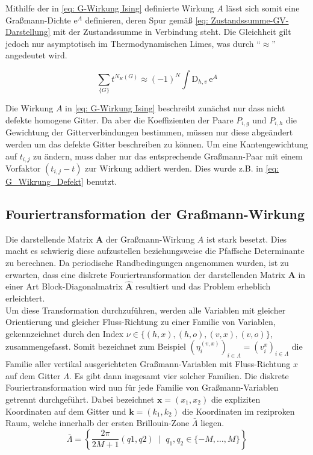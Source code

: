 \noindent Mithilfe der in \eqref{eq: G-Wirkung Ising} definierte Wirkung $A$ lässt sich somit eine Graßmann-Dichte $\mathrm{e}^A$ definieren, deren Spur gemäß \eqref{eq: Zustandssumme-GV-Darstellung} mit der Zustandssumme in Verbindung steht. Die Gleichheit gilt jedoch nur asymptotisch im Thermodynamischen Limes, was durch ``$\approx$'' angedeutet wird. 

\begin{grayframe}[frametitle = {Zustandssumme als Spur einer Graßmann-Funktion}]
\centering
\begin{equation} \label{eq: Zustandssumme-GV-Darstellung}
\sum_{\{ G\}} t^{N_K(G)} \approx (-1)^N \int \mathrm{D}_{h,v} \,\mathrm{e}^A 
\end{equation}

\end{grayframe}
 
\noindent Die Wirkung $A$ in \eqref{eq: G-Wirkung Ising} beschreibt zunächst nur dass nicht defekte homogene Gitter. Da aber die Koeffizienten der Paare $P_{i,g}$ und $P_{i,h}$ die Gewichtung der Gitterverbindungen bestimmen, müssen nur diese abgeändert werden um das defekte Gitter beschreiben zu können. Um eine Kantengewichtung auf $t_{i,j}$ zu ändern, muss daher nur das entsprechende Graßmann-Paar mit einem Vorfaktor $(t_{i,j}-t)$ zur Wirkung addiert werden. Dies wurde z.B. in \eqref{eq: G_Wikrung_Defekt} benutzt.
 
 
 \subsection{Fouriertransformation der Graßmann-Wirkung} \label{sec: Fouriertransformation der Graßmann-Wirkung}

\noindent Die darstellende Matrix $\bm A$ der Graßmann-Wirkung $A$ ist stark besetzt. Dies macht es schwierig diese aufzustellen beziehungsweise die Pfaffsche Determinante zu berechnen. Da periodische Randbedingungen angenommen wurden, ist zu erwarten, dass eine diskrete Fouriertransformation der darstellenden Matrix $\bm{A}$ in einer Art Block-Diagonalmatrix $\bm{\hat{A}}$ resultiert und das Problem erheblich erleichtert.\\
Um diese Transformation durchzuführen, werden alle Variablen mit gleicher Orientierung und gleicher Fluss-Richtung zu einer Familie von Variablen, gekennzeichnet durch den Index $\nu \in \{(h,x), (h,o), (v,x), (v,o)\} $, zusammengefasst. Somit bezeichnet zum Beispiel $(\eta_i^{(v,x)})_{i \in \Lambda} = (v^x_i)_{i \in \Lambda}$ die Familie aller vertikal ausgerichteten Graßmann-Variablen mit Fluss-Richtung $x$ auf dem Gitter $\Lambda$. Es gibt dann insgesamt vier solcher Familien. Die diskrete Fouriertransformation wird nun für jede Familie von Graßmann-Variablen getrennt durchgeführt. Dabei bezeichnet $\bm{x} = (x_1, x_2)$ die expliziten Koordinaten auf dem Gitter und $\bm{k} = (k_1,k_2)$ die Koordinaten im reziproken Raum, welche innerhalb der ersten Brillouin-Zone $\bar{\Lambda}$ liegen. 
\begin{equation} \label{def: Brillouin-Zone}
\bar{\Lambda} = \left\{ \frac{2\pi}{2M+1}(q1, q2) \;\; | \;\; q_1,q_2 \in \{-M,\dots,M\} \right\} 
\end{equation}


